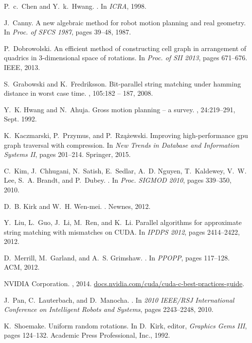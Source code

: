 \documentclass[a4paper]{article}
\begin{document}
\begin{thebibliography}{10}

P.~c.~Chen and Y.~k.~Hwang.
.
\newblock In {\em ICRA}, 1998.

J.~Canny.
\newblock A new algebraic method for robot motion planning and real geometry.
\newblock In {\em Proc. of SFCS 1987}, pages 39--48, 1987.

P.~Dobrowolski.
\newblock An efficient method of constructing cell graph in arrangement of
  quadrics in 3-dimensional space of rotations.
\newblock In {\em Proc. of {SII} 2013}, pages 671--676. {IEEE}, 2013.

S.~Grabowski and K.~Fredriksson.
\newblock Bit-parallel string matching under hamming distance in worst case
  time.
, 105:182 -- 187, 2008.

Y.~K. Hwang and N.~Ahuja.
\newblock Gross motion planning -- a survey.
, 24:219--291, Sept. 1992.

K.~Kaczmarski, P.~Przymus, and P.~Rz{\k{a}}{\.z}ewski.
\newblock Improving high-performance gpu graph traversal with compression.
\newblock In {\em New Trends in Database and Information Systems II}, pages
  201--214. Springer, 2015.

C.~Kim, J.~Chhugani, N.~Satish, E.~Sedlar, A.~D. Nguyen, T.~Kaldewey, V.~W.
  Lee, S.~A. Brandt, and P.~Dubey.
.
\newblock In {\em Proc. SIGMOD 2010}, pages 339--350, 2010.

D.~B. Kirk and W.~H. Wen-mei.
.
\newblock Newnes, 2012.

Y.~Liu, L.~Guo, J.~Li, M.~Ren, and K.~Li.
\newblock Parallel algorithms for approximate string matching with 
  mismatches on {CUDA}.
\newblock In {\em {IPDPS} 2012}, pages 2414--2422, 2012.

D.~Merrill, M.~Garland, and A.~S. Grimshaw.
.
\newblock In {\em PPOPP}, pages 117--128. ACM, 2012.

{NVIDIA Corporation}.
, 2014.
\newblock \url{docs.nvidia.com/cuda/cuda-c-best-practices-guide}.

J.~Pan, C.~Lauterbach, and D.~Manocha.
.
\newblock In {\em 2010 {IEEE/RSJ} International Conference on Intelligent
  Robots and Systems}, pages 2243--2248, 2010.

K.~Shoemake.
\newblock Uniform random rotations.
\newblock In D.~Kirk, editor, {\em {Graphics Gems III}}, pages 124--132.
  Academic Press Professional, Inc., 1992.

\end{thebibliography}
\end{document}
